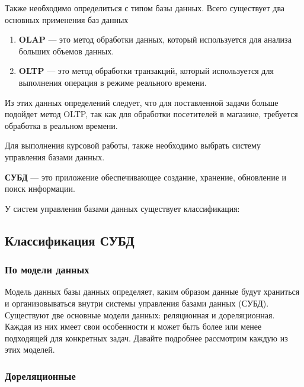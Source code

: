 Также необходимо определиться с типом базы данных. 
Всего существует два основных применения баз данных

\begin{enumerate}[label=\arabic*.]
    \item \textbf{OLAP} \cite{OLAP} --- это метод обработки данных, который используется для анализа
                    больших объемов данных.
    \item \textbf{OLTP} \cite{OLTP} --- это метод обработки транзакций, который используется для
                    выполнения операция в режиме реального времени.
\end{enumerate}

Из этих данных определений следует, что для поставленной задачи больше подойдет метод
OLTP, так как для обработки посетителей в магазине, требуется обработка в реальном времени.

Для выполнения курсовой работы, также необходимо выбрать систему управления базами данных.

\textbf{СУБД} --- это приложение обеспечивающее создание, хранение, обновление и поиск информации.

У систем управления базами данных существует классификация: 

\subsection{Классификация СУБД}

\subsubsection{По модели данных}

Модель данных базы данных определяет, каким образом данные будут храниться и организовываться внутри системы управления базами данных (СУБД). Существуют две основные модели данных: реляционная и дореляционная. Каждая из них имеет свои особенности и может быть более или менее подходящей для конкретных задач. Давайте подробнее рассмотрим каждую из этих моделей.

\subsubsection{Дореляционные}


